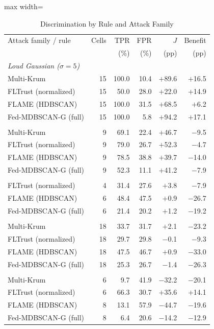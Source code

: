 \begin{table}[!t]
\centering\footnotesize
\setlength{\tabcolsep}{4pt}
\caption{Discrimination by Rule and Attack Family}\label{tab:discrimination_method}
\begin{adjustbox}{max width=\columnwidth}
\begin{tabular}{lrrrrr}
\toprule
Attack family / rule & Cells & TPR & FPR & $J$ & Benefit \\
 &  & (\%) & (\%) & (pp) & (pp) \\
\midrule
\multicolumn{6}{l}{\emph{Loud Gaussian ($\sigma=5$)}} \\
\quad Multi-Krum & 15 & 100.0 & 10.4 & $+$89.6 & $+$16.5 \\
\quad FLTrust (normalized) & 15 & 50.0 & 28.0 & $+$22.0 & $+$14.9 \\
\quad FLAME (HDBSCAN) & 15 & 100.0 & 31.5 & $+$68.5 & $+$6.2 \\
\quad Fed-MDBSCAN-G (full) & 15 & 100.0 & 5.8 & $+$94.2 & $+$17.1 \\
\addlinespace[3pt]
\multicolumn{6}{l}{\emph{Label flipping}} \\
\quad Multi-Krum & 9 & 69.1 & 22.4 & $+$46.7 & $-$9.5 \\
\quad FLTrust (normalized) & 9 & 79.0 & 26.7 & $+$52.3 & $-$4.7 \\
\quad FLAME (HDBSCAN) & 9 & 78.5 & 38.8 & $+$39.7 & $-$14.0 \\
\quad Fed-MDBSCAN-G (full) & 9 & 52.3 & 11.1 & $+$41.2 & $-$7.9 \\
\addlinespace[3pt]
\multicolumn{6}{l}{\emph{Patch backdoor}} \\
\quad FLTrust (normalized) & 4 & 31.4 & 27.6 & $+$3.8 & $-$7.9 \\
\quad FLAME (HDBSCAN) & 6 & 48.4 & 47.5 & $+$0.9 & $-$26.7 \\
\quad Fed-MDBSCAN-G (full) & 6 & 21.4 & 20.2 & $+$1.2 & $-$19.2 \\
\addlinespace[3pt]
\multicolumn{6}{l}{\emph{Bounded random direction}} \\
\quad Multi-Krum & 18 & 33.7 & 31.7 & $+$2.1 & $-$23.2 \\
\quad FLTrust (normalized) & 18 & 29.7 & 29.8 & $-$0.1 & $-$9.3 \\
\quad FLAME (HDBSCAN) & 18 & 47.5 & 46.7 & $+$0.9 & $-$33.0 \\
\quad Fed-MDBSCAN-G (full) & 18 & 25.3 & 26.7 & $-$1.4 & $-$26.3 \\
\addlinespace[3pt]
\multicolumn{6}{l}{\emph{Constrained omniscient}} \\
\quad Multi-Krum & 6 & 9.7 & 41.9 & $-$32.2 & $-$20.1 \\
\quad FLTrust (normalized) & 6 & 66.3 & 30.7 & $+$35.6 & $+$14.1 \\
\quad FLAME (HDBSCAN) & 8 & 13.1 & 57.9 & $-$44.7 & $-$19.6 \\
\quad Fed-MDBSCAN-G (full) & 8 & 6.4 & 20.6 & $-$14.2 & $-$12.9 \\
\bottomrule
\end{tabular}
\end{adjustbox}


\end{table}
